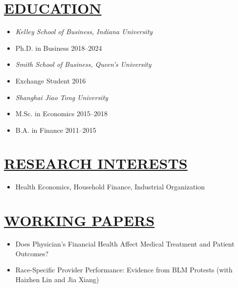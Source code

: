 \documentclass{res}
\begin{document}
\begin{resume}
\section{\large{\ul{EDUCATION}}}
\vspace{1.8em}
\begin{itemize}[leftmargin=15pt,labelindent=-15pt,itemindent=-15pt,itemsep=0.1em]
  \item[] \textit{Kelley School of Business, Indiana University} 
  \item[] \hspace{13pt} Ph.D. in Business \hfill    2018--2024 
  \item[] \textit{Smith School of Business, Queen's University}                                         
  \item[] \hspace{13pt} Exchange Student \hfill     2016
  \item[] \textit{Shanghai Jiao Tong University}                                  
  \item[] \hspace{13pt} M.Sc. in Economics     \hfill    2015--2018
  \item[] \hspace{13pt} B.A. in Finance  \hfill    2011--2015
\end{itemize}

\section{\large{\ul{RESEARCH INTERESTS}}}
\vspace{1.8em}
\begin{itemize}[leftmargin=15pt,labelindent=-15pt,itemindent=-15pt,itemsep=0.1em]
  \item[] Health Economics, Household Finance, Industrial Organization 
\end{itemize}

\section{\large{\ul{WORKING PAPERS}}}
\vspace{1.8em}
\begin{itemize}[leftmargin=15pt,labelindent=-15pt,itemindent=-15pt,itemsep=0.1em]
    \item[] Does Physician's Financial Health Affect Medical Treatment and Patient Outcomes?   
    \item[] Race-Specific Provider Performance: Evidence from BLM Protests (with Haizhen Lin and Jia Xiang)
\end{itemize}


\end{resume}
\end{document}
